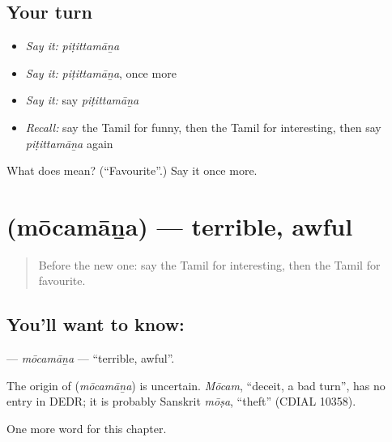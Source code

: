 \subsection*{Your turn}
\begin{itemize}
\raggedright
  \item \emph{Say it:} \emph{piṭittamāṉa}
  \item \emph{Say it:} \emph{piṭittamāṉa}, once more
  \item \emph{Say it:} say \emph{piṭittamāṉa}
  \item \emph{Recall:} say the Tamil for funny, then the Tamil for interesting, then say \emph{piṭittamāṉa} again
\end{itemize}

\begin{tcolorbox}[breakable,colback=teal!4,colframe=teal!35!black,title={Before you move on}]
What does  mean? (\textquotedblleft{}Favourite\textquotedblright{}.) Say it once more.
\end{tcolorbox}
\section[\texorpdfstring{\ta{மோசமான} (mōcamāṉa)}{மோசமான (mōcamāṉa)}]{ (mōcamāṉa) — terrible, awful}

\label{lesson:TA-C181-mocamana}



\begin{quote}
Before the new one: say the Tamil for interesting, then the Tamil for favourite.
\end{quote}

\subsection*{You'll want to know: }
\textbf{} — \emph{mōcamāṉa} — \textquotedblleft{}terrible, awful\textquotedblright{}.

\begin{cousinweb}
The origin of \textbf{} (\emph{mōcamāṉa}) is uncertain. \emph{Mōcam}, \textquotedblleft{}deceit, a bad turn\textquotedblright{}, has no entry in DEDR; it is probably Sanskrit \emph{mōṣa}, \textquotedblleft{}theft\textquotedblright{} (CDIAL 10358).
\end{cousinweb}

\begin{grammarlens}[title={What you've built}]
One more word for this chapter.
\end{grammarlens}

